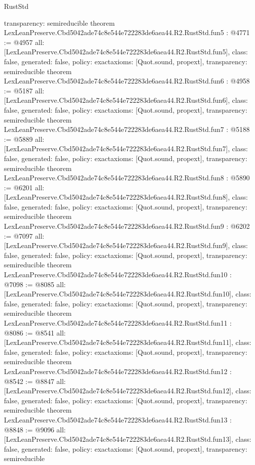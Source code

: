 \begin{lexlean}{RustStd}
\begin{coremodule}
{  transparency: semireducible
}
theorem LexLeanPreserve.Cbd5042ade74c8e544e722283de6aea44.R2.RustStd.fun5 : @4771 := @4957 {
  all: [LexLeanPreserve.Cbd5042ade74c8e544e722283de6aea44.R2.RustStd.fun5],
  class: false,
  generated: false,
  policy: exact{axioms: [Quot.sound, propext]},
  transparency: semireducible
}
theorem LexLeanPreserve.Cbd5042ade74c8e544e722283de6aea44.R2.RustStd.fun6 : @4958 := @5187 {
  all: [LexLeanPreserve.Cbd5042ade74c8e544e722283de6aea44.R2.RustStd.fun6],
  class: false,
  generated: false,
  policy: exact{axioms: [Quot.sound, propext]},
  transparency: semireducible
}
theorem LexLeanPreserve.Cbd5042ade74c8e544e722283de6aea44.R2.RustStd.fun7 : @5188 := @5889 {
  all: [LexLeanPreserve.Cbd5042ade74c8e544e722283de6aea44.R2.RustStd.fun7],
  class: false,
  generated: false,
  policy: exact{axioms: [Quot.sound, propext]},
  transparency: semireducible
}
theorem LexLeanPreserve.Cbd5042ade74c8e544e722283de6aea44.R2.RustStd.fun8 : @5890 := @6201 {
  all: [LexLeanPreserve.Cbd5042ade74c8e544e722283de6aea44.R2.RustStd.fun8],
  class: false,
  generated: false,
  policy: exact{axioms: [Quot.sound, propext]},
  transparency: semireducible
}
theorem LexLeanPreserve.Cbd5042ade74c8e544e722283de6aea44.R2.RustStd.fun9 : @6202 := @7097 {
  all: [LexLeanPreserve.Cbd5042ade74c8e544e722283de6aea44.R2.RustStd.fun9],
  class: false,
  generated: false,
  policy: exact{axioms: [Quot.sound, propext]},
  transparency: semireducible
}
theorem LexLeanPreserve.Cbd5042ade74c8e544e722283de6aea44.R2.RustStd.fun10 : @7098 := @8085 {
  all: [LexLeanPreserve.Cbd5042ade74c8e544e722283de6aea44.R2.RustStd.fun10],
  class: false,
  generated: false,
  policy: exact{axioms: [Quot.sound, propext]},
  transparency: semireducible
}
theorem LexLeanPreserve.Cbd5042ade74c8e544e722283de6aea44.R2.RustStd.fun11 : @8086 := @8541 {
  all: [LexLeanPreserve.Cbd5042ade74c8e544e722283de6aea44.R2.RustStd.fun11],
  class: false,
  generated: false,
  policy: exact{axioms: [Quot.sound, propext]},
  transparency: semireducible
}
theorem LexLeanPreserve.Cbd5042ade74c8e544e722283de6aea44.R2.RustStd.fun12 : @8542 := @8847 {
  all: [LexLeanPreserve.Cbd5042ade74c8e544e722283de6aea44.R2.RustStd.fun12],
  class: false,
  generated: false,
  policy: exact{axioms: [Quot.sound, propext]},
  transparency: semireducible
}
theorem LexLeanPreserve.Cbd5042ade74c8e544e722283de6aea44.R2.RustStd.fun13 : @8848 := @9096 {
  all: [LexLeanPreserve.Cbd5042ade74c8e544e722283de6aea44.R2.RustStd.fun13],
  class: false,
  generated: false,
  policy: exact{axioms: [Quot.sound, propext]},
  transparency: semireducible
}
\end{coremodule}
\end{lexlean}
